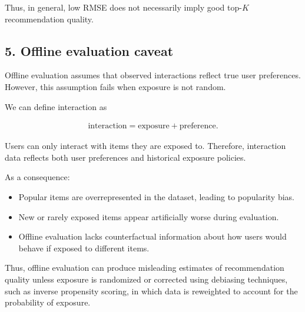 \documentclass[11pt]{article}
\begin{document}
\begin{appendices}
\begin{itemize}
\end{itemize}

\noindent Thus, in general, low RMSE does not necessarily imply good top-$K$ recommendation quality.


\vspace{1cm}

\subsection*{5. Offline evaluation caveat}

\noindent Offline evaluation assumes that observed interactions reflect true user preferences. However, this assumption fails when exposure is not random.

\noindent We can define interaction as

\begin{align*}
\text{interaction} = \text{exposure} + \text{preference}.
\end{align*}

\noindent Users can only interact with items they are exposed to. Therefore, interaction data reflects both user preferences and historical exposure policies.

\noindent As a consequence:

\begin{itemize}

\item Popular items are overrepresented in the dataset, leading to popularity bias.

\item New or rarely exposed items appear artificially worse during evaluation.

\item Offline evaluation lacks counterfactual information about how users would behave if exposed to different items.

\end{itemize}

\noindent Thus, offline evaluation can produce misleading estimates of recommendation quality unless exposure is randomized or corrected using debiasing techniques, such as inverse propensity scoring, in which data is reweighted to account for the probability of exposure.

\end{appendices}
\printbibliography
\end{document}
